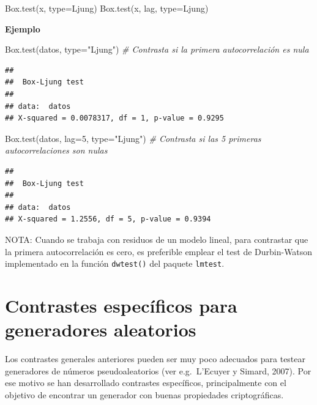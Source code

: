 \documentclass[
]{book}
\newenvironment{Shaded}{\begin{snugshade}}{\end{snugshade}}
\newcommand{\AttributeTok}[1]{\textcolor[rgb]{0.77,0.63,0.00}{#1}}
\newcommand{\CommentTok}[1]{\textcolor[rgb]{0.56,0.35,0.01}{\textit{#1}}}
\newcommand{\DecValTok}[1]{\textcolor[rgb]{0.00,0.00,0.81}{#1}}
\newcommand{\FunctionTok}[1]{\textcolor[rgb]{0.00,0.00,0.00}{#1}}
\newcommand{\NormalTok}[1]{#1}
\newcommand{\StringTok}[1]{\textcolor[rgb]{0.31,0.60,0.02}{#1}}
\theoremstyle{break}
\theoremstyle{definition}
\theoremstyle{definition}
\theoremstyle{definition}
\theoremstyle{definition}
\theoremstyle{remark}
\begin{document}
\begin{Shaded}
\begin{Highlighting}[]
    \FunctionTok{Box.test}\NormalTok{(x, }\AttributeTok{type=}\NormalTok{Ljung)}
    \FunctionTok{Box.test}\NormalTok{(x, lag, }\AttributeTok{type=}\NormalTok{Ljung)}
\end{Highlighting}
\end{Shaded}

\textbf{Ejemplo}

\begin{Shaded}
\begin{Highlighting}[]
\FunctionTok{Box.test}\NormalTok{(datos, }\AttributeTok{type=}\StringTok{"Ljung"}\NormalTok{) }\CommentTok{\# Contrasta si la primera autocorrelación es nula }
\end{Highlighting}
\end{Shaded}

\begin{verbatim}
## 
##  Box-Ljung test
## 
## data:  datos
## X-squared = 0.0078317, df = 1, p-value = 0.9295
\end{verbatim}

\begin{Shaded}
\begin{Highlighting}[]
\FunctionTok{Box.test}\NormalTok{(datos, }\AttributeTok{lag=}\DecValTok{5}\NormalTok{, }\AttributeTok{type=}\StringTok{"Ljung"}\NormalTok{) }\CommentTok{\# Contrasta si las 5 primeras autocorrelaciones son nulas}
\end{Highlighting}
\end{Shaded}

\begin{verbatim}
## 
##  Box-Ljung test
## 
## data:  datos
## X-squared = 1.2556, df = 5, p-value = 0.9394
\end{verbatim}

NOTA: Cuando se trabaja con residuos de un modelo lineal, para contrastar que la primera autocorrelación es cero, es preferible emplear el test de
Durbin-Watson implementado en la función \texttt{dwtest()} del paquete \texttt{lmtest}.

\hypertarget{contrastes-especuxedficos-para-generadores-aleatorios}{%
\section{Contrastes específicos para generadores aleatorios}\label{contrastes-especuxedficos-para-generadores-aleatorios}}

Los contrastes generales anteriores pueden ser muy poco adecuados para testear generadores de números pseudoaleatorios (ver e.g.~L'Ecuyer y Simard, 2007). Por ese motivo se han desarrollado contrastes específicos, principalmente con el objetivo de encontrar un generador con buenas propiedades criptográficas.
\end{document}
